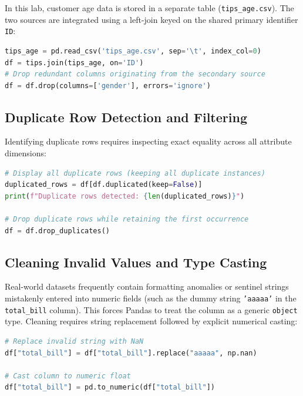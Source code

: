 In this lab, customer age data is stored in a separate table (\texttt{tips\_age.csv}). The two sources are integrated using a left-join keyed on the shared primary identifier \texttt{ID}:

\begin{lstlisting}[language=Python, style=code]
tips_age = pd.read_csv('tips_age.csv', sep='\t', index_col=0)
df = tips.join(tips_age, on='ID')
# Drop redundant columns originating from the secondary source
df = df.drop(columns=['gender'], errors='ignore')
\end{lstlisting}

\subsection{Duplicate Row Detection and Filtering}

Identifying duplicate rows requires inspecting exact equality across all attribute dimensions:

\begin{lstlisting}[language=Python, style=code]
# Display all duplicate rows (keeping all duplicate instances)
duplicated_rows = df[df.duplicated(keep=False)]
print(f"Duplicate rows detected: {len(duplicated_rows)}")

# Drop duplicate rows while retaining the first occurrence
df = df.drop_duplicates()
\end{lstlisting}

\subsection{Cleaning Invalid Values and Type Casting}

Real-world datasets frequently contain formatting anomalies or sentinel strings mistakenly entered into numeric fields (such as the dummy string \texttt{'aaaaa'} in the \texttt{total\_bill} column). This forces Pandas to treat the column as a generic \texttt{object} type. Cleaning requires string replacement followed by explicit numerical casting:

\begin{lstlisting}[language=Python, style=code]
# Replace invalid string with NaN
df["total_bill"] = df["total_bill"].replace("aaaaa", np.nan)

# Cast column to numeric float
df["total_bill"] = pd.to_numeric(df["total_bill"])
\end{lstlisting}

